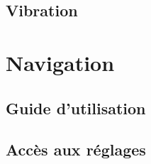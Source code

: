 \documentclass[UTF8]{EPURapport}
\begin{document}
\subsection{Vibration}

\section{Navigation}
\subsection{Guide d'utilisation}
\subsection{Accès aux réglages}

\annexes
\end{document}
